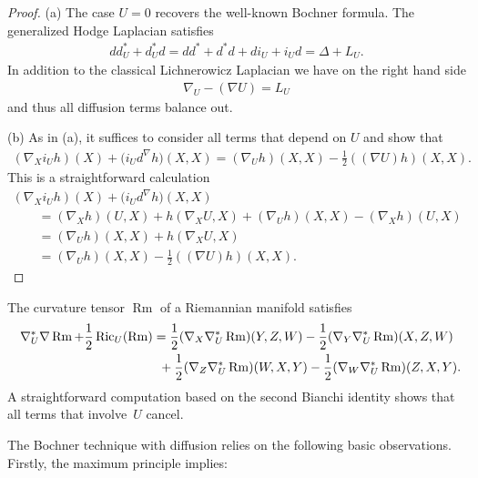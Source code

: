 \documentclass[pdftex]{sigma}
\numberwithin{equation}{section}
\newcommand{\Ric} {\operatorname{Ric}}
\newcommand{\Rm} {\operatorname{Rm}}
\begin{document}
\begin{proof}
(a) The case $U=0$ recovers the well-known Bochner formula. The generalized Hodge Laplacian satisfies
\begin{gather*}
d d^{*}_U + d^{*}_U d = d d^{*} + d^{*} d + d i_U + i_U d = \Delta + L_U.
\end{gather*}
In addition to the classical Lichnerowicz Laplacian we have on the right hand side
\begin{gather*}
\nabla_U - ( \nabla U ) = L_U
\end{gather*}
and thus all diffusion terms balance out.

(b) As in (a), it suffices to consider all terms that depend on $U$ and show that
\begin{gather*}
( \nabla_X i_U h ) (X) + \big( i_U d^{\nabla} h \big) (X,X) =  ( \nabla_U h ) (X,X) - \frac{1}{2} ( (\nabla U) h)(X,X).
\end{gather*}
This is a straightforward calculation
\begin{gather*}
 ( \nabla_X i_U h  ) (X)   + \big( i_U d^{\nabla} h \big) (X,X) \\
 \qquad{} =  ( \nabla_X h ) (U,X) + h ( \nabla_X U, X ) +  ( \nabla_U h ) (X,X) -  ( \nabla_ X h )  ( U, X  ) \\
\qquad{} =  ( \nabla_U h  ) (X,X) + h  ( \nabla_X U, X ) \\
\qquad{} =  ( \nabla_U h ) (X,X) - \frac{1}{2}  ( ( \nabla U ) h ) (X,X).\tag*{\qed}
\end{gather*}\renewcommand{\qed}{}
\end{proof}

\begin{Remark}The curvature tensor $\Rm$ of a Riemannian manifold satisfies
\begin{gather*}
\nabla^{*}_U \nabla \Rm + \frac{1}{2} \Ric_U( \Rm ) =   \frac{1}{2}  ( \nabla_X \nabla_U^{*} \Rm )(Y,Z,W) - \frac{1}{2}  ( \nabla_Y \nabla_U^{*} \Rm  ) (X,Z,W) \\
\hphantom{\nabla^{*}_U \nabla \Rm + \frac{1}{2} \Ric_U( \Rm ) =}{} + \frac{1}{2}  ( \nabla_Z \nabla_U^{*} \Rm  )(W, X,Y) - \frac{1}{2}  ( \nabla_W \nabla_U^{*} \Rm  ) (Z,X,Y).
\end{gather*}
A straightforward computation based on the second Bianchi identity shows that all terms that involve~$U$ cancel.
\end{Remark}

The Bochner technique with diffusion relies on the following basic observations. Firstly, the maximum principle implies:
\end{document}
